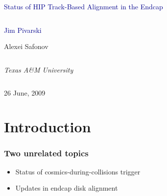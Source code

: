 \documentclass[compress]{beamer}
\begin{document}
\begin{frame}
\vfill
\begin{center}
\textcolor{darkblue}{\Large Status of HIP Track-Based Alignment in the Endcap}

\vfill
\begin{columns}
\begin{center}
\large
\textcolor{darkblue}{Jim Pivarski}

\vspace{0.2 cm}
Alexei Safonov
\end{center}
\end{columns}

\begin{columns}
\begin{center}
\scriptsize
{\it Texas A\&M University}
\end{center}
\end{columns}

\vfill
26 June, 2009

\end{center}
\end{frame}


\small

\section*{Introduction}

\begin{frame}
\frametitle{Two unrelated topics}
\begin{itemize}\setlength{\itemsep}{0.75 cm}
\item Status of cosmics-during-collisions trigger
\item Updates in endcap disk alignment
\end{itemize}
\end{frame}
\end{document}
